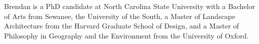 \maketitlepage


\begin{biography}
Brendan is a PhD candidate at North Carolina State University with
a Bachelor of Arts from Sewanee, the University of the South,
a Master of Landscape Architecture from the Harvard Graduate School of Design,
and
a Master of Philosophy in Geography and the Environment from the University of Oxford.
\end{biography}




\thesistableofcontents

\thesislistoftables

\thesislistoffigures

